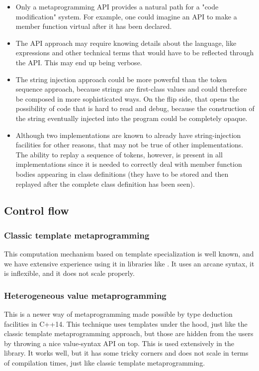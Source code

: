 \documentclass{wg21}
\begin{document}
\begin{itemize}
  \item Only a metaprogramming API provides a natural path for a "code modification"
        system. For example, one could imagine an API to make a member function
        virtual after it has been declared.
  \item The API approach may require knowing details about the language, like
        expressions and other technical terms that would have to be reflected
        through the API. This may end up being verbose.
  \item The string injection approach could be more powerful than the token sequence
        approach, because strings are first-class values and could therefore be
        composed in more sophisticated ways. On the flip side, that opens the
        possibility of code that is hard to read and debug, because the construction
        of the string eventually injected into the program could be completely opaque.
  \item Although two implementations are known to already have string-injection
        facilities for other reasons, that may not be true of other implementations.
        The ability to replay a sequence of tokens, however, is present in all
        implementations since it is needed to correctly deal with member function
        bodies appearing in class definitions (they have to be stored and then
        replayed after the complete class definition has been seen).
\end{itemize}


\subsection{Control flow}

\subsubsection{Classic template metaprogramming}
This computation mechanism based on template specialization is well known, and
we have extensive experience using it in libraries like \cite{Boost.MPL}. It
uses an arcane syntax, it is inflexible, and it does not scale properly.

\subsubsection{Heterogeneous value metaprogramming}
This is a newer way of metaprogramming made possible by type deduction facilities
in C++14. This technique uses templates under the hood, just like the classic
template metaprogramming approach, but those are hidden from the users by
throwing a nice value-syntax API on top. This is used extensively in the
\cite{Boost.Hana} library. It works well, but it has some tricky corners
and does not scale in terms of compilation times, just like classic template
metaprogramming.
\end{document}
